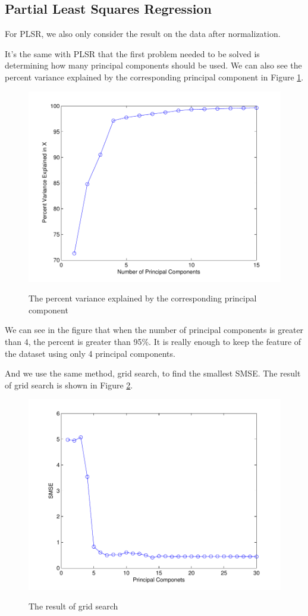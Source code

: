 \documentclass[a4paper]{article}
\begin{document}
\newpage
\subsection{Partial Least Squares Regression}
For PLSR, we also only consider the result on the data after normalization. 

It's the same with PLSR that the first problem needed to be solved is determining how many principal components should be used. We can also see the percent variance explained by the corresponding principal component in Figure \ref{plsrb1}.
\begin{figure}[h]
  \centering
  \includegraphics[width=.6\textwidth]{images/explain_PLSR.pdf}\\
  \caption{The percent variance explained by the corresponding principal component}\label{plsrb1}
\end{figure}

We can see in the figure that when the number of principal components is greater than 4, the percent is greater than 95\%. It is really enough to keep the feature of the dataset using only 4 principal components.

And we use the same method, grid search, to find the smallest SMSE. The result of grid search is shown in Figure \ref{plsrb2}.
\begin{figure}[h]
  \centering
  \includegraphics[width=.6\textwidth]{images/gsearch_PLSR.pdf}\\
  \caption{The result of grid search}\label{plsrb2}
\end{figure}
\end{document}

